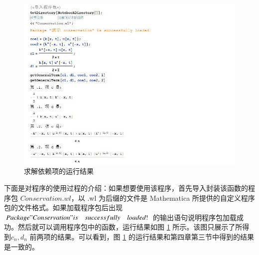 \begin{figure}[!htp]
	\centering
	\includegraphics[width=0.97\linewidth]{getGeneralTerm.jpg}
	\caption{求解依赖项的运行结果}
	\label{picture-5-1}
\end{figure}
下面是对程序的使用过程的介绍：如果想要使用该程序，首先导入封装该函数的程序包 $Conservation.wl$，以 .wl 为后缀的文件是 Mathematica 所提供的自定义程序包的文件格式。如果加载程序包后出现 $Package "Conservation" is\quad successfully\quad loaded!$ 的输出语句说明程序包加载成功。然后就可以调用程序包中的函数，运行结果如图 \ref{picture-5-1} 所示。该图只展示了所得到$c_n, d_n$ 前两项的结果。可以看到，图 \ref{picture-5-1} 的运行结果和第四章第三节中得到的结果是一致的。


